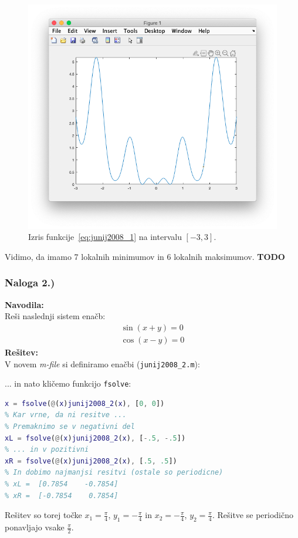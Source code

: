 \documentclass[a4paper,11pt]{article}
\begin{document}
\begin{figure}[hbt]
\centering
\includegraphics[scale=.4]{images/junij2008_1_plot.png}
\caption{Izris funkcije~\ref{eq:junij2008_1} na intervalu $[-3, 3]$.}
\label{img:junij2008_1_plot}
\end{figure}
Vidimo, da imamo 7 lokalnih minimumov in 6 lokalnih maksimumov. \textbf{TODO}


\subsubsection{Naloga 2.)}
\label{task:junij2008_2}

\textbf{Navodila:} \\
Reši naslednji sistem enačb:
\begin{equation} \label{eq:junij2008_2}
	\begin{gathered}
		\sin(x + y) = 0 \\
		\cos(x - y) = 0
	\end{gathered}
\end{equation}
\textbf{Rešitev:} \\
V novem \textit{m-file} si definiramo enačbi (\texttt{junij2008\_2.m}):

... in nato kličemo funkcijo \texttt{fsolve}:
\begin{lstlisting}[language=Matlab]
% Poskusimo najprej s [0, 0]
x = fsolve(@(x)junij2008_2(x), [0, 0])
% Kar vrne, da ni resitve ...
% Premaknimo se v negativni del
xL = fsolve(@(x)junij2008_2(x), [-.5, -.5])
% ... in v pozitivni
xR = fsolve(@(x)junij2008_2(x), [.5, .5])
% In dobimo najmanjsi resitvi (ostale so periodicne)
% xL = 	[0.7854    -0.7854]
% xR =  [-0.7854    0.7854]
\end{lstlisting}
Rešitev so torej točke $x_1 = \frac{\pi}{4}$, $y_1 = -\frac{\pi}{4}$ in $x_2 = -\frac{\pi}{4}$, $y_2 = \frac{\pi}{4}$. Rešitve se periodično ponavljajo vsake $\frac{\pi}{2}$.
\end{document}

